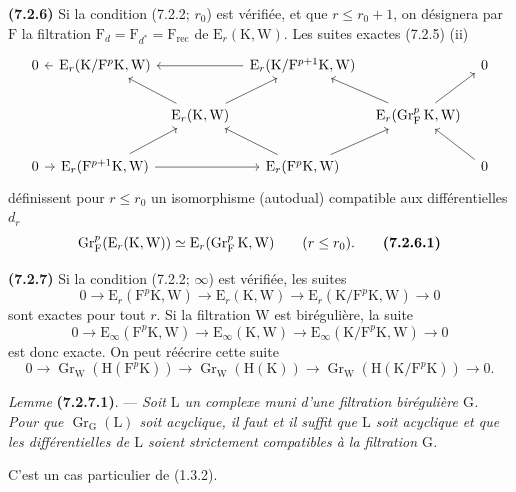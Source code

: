 \documentclass[11pt,leqno]{article}
\begin{document}
\textbf{(7.2.6)} Si la condition (7.2.2; \(r_0\)) est vérifiée, et que \(r\leq r_0+1\), on désignera par \(\mathrm{F}\) la filtration \(\mathrm{F}_d=\mathrm{F}_{d^{*}}=\mathrm{F}_{\mathrm{rec}}\) de \(\mathrm{E}_r(\mathrm{K},\mathrm{W})\). Les suites exactes (7.2.5) (ii)
\[
\begin{tikzcd}[column sep=0.6em,row sep=1.8em]
0
& \mathrm{E}_r(\mathrm{K}/\mathrm{F}^p\mathrm{K},\mathrm{W}) \arrow[l]
& & \mathrm{E}_r(\mathrm{K}/\mathrm{F}^{p+1}\mathrm{K},\mathrm{W}) \arrow[ll]
& & 0 \\
& & \mathrm{E}_r(\mathrm{K},\mathrm{W}) \arrow[ul] \arrow[ur]
& & \mathrm{E}_r(\operatorname{Gr}_{\mathrm{F}}^p\mathrm{K},\mathrm{W})
    \arrow[ul] \arrow[ur]
& \\
0 \arrow[r]
& \mathrm{E}_r(\mathrm{F}^{p+1}\mathrm{K},\mathrm{W}) \arrow[ur] \arrow[rr]
& & \mathrm{E}_r(\mathrm{F}^p\mathrm{K},\mathrm{W}) \arrow[ul] \arrow[ur]
& & 0 \arrow[ul]
\end{tikzcd}
\]
définissent pour \(r\leq r_0\) un isomorphisme (autodual) compatible aux différentielles \(d_r\)
\[
\operatorname{Gr}_{\mathrm{F}}^p(\mathrm{E}_r(\mathrm{K},\mathrm{W}))
\simeq\mathrm{E}_r(\operatorname{Gr}_{\mathrm{F}}^p\mathrm{K},\mathrm{W})
\qquad(r\leq r_0).
\tag*{\textbf{(7.2.6.1)}}
\]

\textbf{(7.2.7)} Si la condition (7.2.2; \(\infty\)) est vérifiée, les suites
\[
0\to\mathrm{E}_r(\mathrm{F}^p\mathrm{K},\mathrm{W})
\to\mathrm{E}_r(\mathrm{K},\mathrm{W})
\to\mathrm{E}_r(\mathrm{K}/\mathrm{F}^p\mathrm{K},\mathrm{W})\to 0
\]
sont exactes pour tout \(r\). Si la filtration \(\mathrm{W}\) est birégulière, la suite
\[
0\to\mathrm{E}_{\infty}(\mathrm{F}^p\mathrm{K},\mathrm{W})
\to\mathrm{E}_{\infty}(\mathrm{K},\mathrm{W})
\to\mathrm{E}_{\infty}(\mathrm{K}/\mathrm{F}^p\mathrm{K},\mathrm{W})\to 0
\]
est donc exacte. On peut réécrire cette suite
\[
0\to\operatorname{Gr}_{\mathrm{W}}(\mathrm{H}(\mathrm{F}^p\mathrm{K}))
\to\operatorname{Gr}_{\mathrm{W}}(\mathrm{H}(\mathrm{K}))
\to\operatorname{Gr}_{\mathrm{W}}(\mathrm{H}(\mathrm{K}/\mathrm{F}^p\mathrm{K}))
\to 0.
\]

\textit{Lemme} \textbf{(7.2.7.1)}. — \textit{Soit \(\mathrm{L}\) un complexe muni d’une filtration birégulière \(\mathrm{G}\). Pour que \(\operatorname{Gr}_{\mathrm{G}}(\mathrm{L})\) soit acyclique, il faut et il suffit que \(\mathrm{L}\) soit acyclique et que les différentielles de \(\mathrm{L}\) soient strictement compatibles à la filtration \(\mathrm{G}\).}

C’est un cas particulier de (1.3.2).
\end{document}
